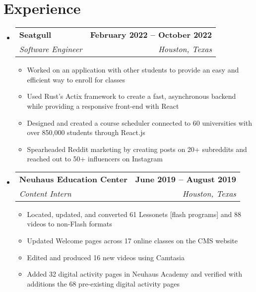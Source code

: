 \documentclass[letterpaper,11pt]{article}
\makeatletter
\newcommand{\resumeItem}[1]{
  \item\small{
    {#1 \vspace{-2pt}}
  }
}
\newcommand{\resumeSubheading}[4]{
  \vspace{-2pt}\item
    \begin{tabular*}{1.0\textwidth}[t]{l@{\extracolsep{\fill}}r}
      \textbf{#1} & \textbf{\small #2} \\
      \textit{\small#3} & \textit{\small #4} \\
    \end{tabular*}\vspace{-7pt}
}
\newcommand{\resumeSubHeadingListStart}{\begin{itemize}[leftmargin=0.0in, label={}]}
\newcommand{\resumeSubHeadingListEnd}{\end{itemize}}
\newcommand{\resumeItemListStart}{\begin{itemize}}
\newcommand{\resumeItemListEnd}{\end{itemize}\vspace{-5pt}}
\makeatother
\begin{document}
\section{Experience}
  \resumeSubHeadingListStart
\begin{comment}  
    \resumeSubheading
      {Chevron}{November 2022 -- Present}
      {Incoming Software Engineer Intern}{Houston, Texas}
\end{comment}      
    \resumeSubheading
      {Seatgull}{February 2022 -- October 2022}
      {Software Engineer}{Houston, Texas}
      \resumeItemListStart
        \resumeItem{Worked on an application with other students to provide an easy and efficient way to enroll for classes}
        \resumeItem{Used Rust’s Actix framework to create a fast, asynchronous backend while providing a responsive front-end with React}
        \resumeItem{Designed and created a course scheduler connected to 60 universities with over 850,000 students through React.js}
        \resumeItem{Spearheaded Reddit marketing by creating posts on 20+ subreddits and reached out to 50+ influencers on Instagram}
      \resumeItemListEnd

    \resumeSubheading
      {Neuhaus Education Center}{June 2019 -- August 2019}
      {Content Intern}{Houston, Texas}
      \resumeItemListStart
        \resumeItem{Located, updated, and converted 61 Lessonets [flash programs] and 88 videos to non-Flash formats}
        \resumeItem{Updated Welcome pages across 17 online classes on the CMS website}
        \resumeItem{Edited and produced 16 new videos using Camtasia}
        \resumeItem{Added 32 digital activity pages in Neuhaus Academy and verified with additions the 68 pre-existing digital activity pages}
    \resumeItemListEnd
    
  \resumeSubHeadingListEnd
\vspace{-16pt}


\end{document}
